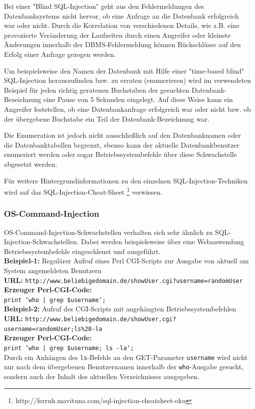 Bei einer "Blind SQL-Injection" geht aus den Fehlermeldungen des 
Datenbanksystems nicht hervor, ob eine Anfrage an die Datenbank 
erfolgreich war oder nicht. Durch die Korrelation von verschiedenen 
Details, wie z.B. eine provozierte Veränderung der Laufzeiten durch 
einen Angreifer oder kleinste Änderungen innerhalb der 
DBMS-Fehlermeldung können Rückschlüsse auf den Erfolg einer Anfrage 
gezogen werden.
 
Um beispielsweise den Namen der Datenbank mit Hilfe einer 
"time-based blind" SQL-Injection herauszufinden bzw. zu erraten 
(enumerieren) wird im verwendeten Beispiel für jeden richtig geratenen 
Buchstaben der gesuchten Datenbank-Bezeichnung eine Pause von 5 Sekunden 
eingelegt. Auf diese Weise kann ein Angreifer feststellen, ob eine 
Datenbankanfrage erfolgreich war oder nicht bzw. ob der übergebene 
Buchstabe ein Teil der Datenbank-Bezeichnung war. 

Die Enumeration ist jedoch nicht ausschließlich auf den Datenbanknamen 
oder die Datenbanktabellen begrenzt, ebenso kann der aktuelle 
Datenbankbenutzer enumeriert werden oder sogar Betriebssystembefehle 
über diese Schwachstelle abgesetzt werden.

Für weitere Hintergrundinformationen zu den einzelnen 
SQL-Injection-Techniken wird auf das SQL-Injection-Cheat-Sheet
\footnote{http://ferruh.mavituna.com/sql-injection-cheatsheet-oku} 
verwiesen.

\subsubsection{OS-Command-Injection}

OS-Command-Injection-Schwachstellen verhalten sich sehr ähnlich zu 
SQL-Injection-Schwachstellen. Dabei werden beispielsweise über eine 
Webanwendung Betriebssystembefehle eingeschleust und ausgeführt.
\\
\textbf{Beispiel-1:} Regulärer Aufruf eines Perl CGI-Scripts zur Ausgabe von aktuell am System angemeldeten Benutzern
\\
\textbf{URL:} \texttt{http://www.beliebigedomain.de/showUser.cgi?username=randomUser}
\\
\textbf{Erzeuger Perl-CGI-Code:}
\\
\texttt{\footnotesize{print `who | grep \$username`;}}
\\
\textbf{Beispiel-2:} Aufruf des CGI-Scripts mit angehängten Betriebssystembefehlen
\\
\textbf{URL:} \texttt{http://www.beliebigedomain.de/showUser.cgi?\\username=randomUser;ls\%20-la}
\\
\textbf{Erzeuger Perl-CGI-Code:}
\\
\texttt{\footnotesize{print `who | grep \$username; ls -la`;}}
\\
Durch ein Anhängen des \texttt{ls}-Befehls an den GET-Parameter 
\texttt{username} wird nicht nur nach dem übergebenen Benutzernamen 
innerhalb der \texttt{who}-Ausgabe gesucht, sondern auch der Inhalt 
des aktuellen Verzeichnisses ausgegeben.

